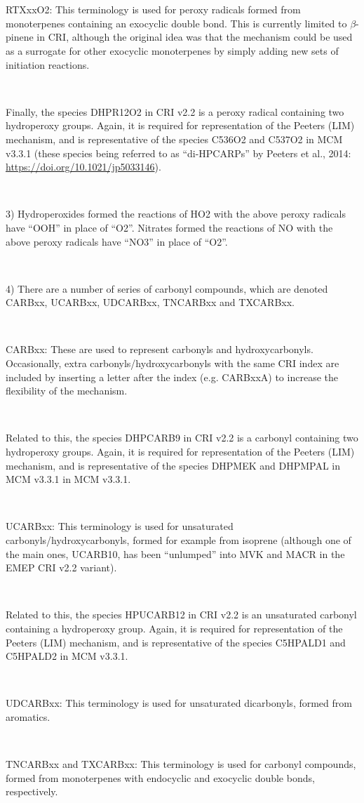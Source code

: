 {{\\}\\ \parbox{\textwidth}{
RTXxxO2: This terminology is used for peroxy radicals formed from monoterpenes containing an exocyclic double bond. This is currently limited to $\beta$-pinene in CRI, although the original idea was that the mechanism could be used as a surrogate for other exocyclic monoterpenes by simply adding new sets of initiation reactions.
\\}\\ \parbox{\textwidth}{
Finally, the species DHPR12O2 in CRI v2.2 is a peroxy radical containing two hydroperoxy groups. Again, it is required for representation of the Peeters (LIM) mechanism, and is representative of the species C536O2 and C537O2 in MCM v3.3.1 (these species being referred to as “di-HPCARPs” by Peeters et al., 2014: \url{https://doi.org/10.1021/jp5033146}).
\\}\\ \parbox{\textwidth}{
3) Hydroperoxides formed the reactions of HO2 with the above peroxy radicals have “OOH” in place of “O2”. Nitrates formed the reactions of NO with the above peroxy radicals have “NO3” in place of “O2”.
\\}\\ \parbox{\textwidth}{
4) There are a number of series of carbonyl compounds, which are denoted CARBxx, UCARBxx, UDCARBxx, TNCARBxx and TXCARBxx.
\\}\\ \parbox{\textwidth}{
CARBxx: These are used to represent carbonyls and hydroxycarbonyls. Occasionally, extra carbonyls/hydroxycarbonyls with the same CRI index are included by inserting a letter after the index (e.g. CARBxxA) to increase the flexibility of the mechanism.
\\}\\ \parbox{\textwidth}{
Related to this, the species DHPCARB9 in CRI v2.2 is a carbonyl containing two hydroperoxy groups. Again, it is required for representation of the Peeters (LIM) mechanism, and is representative of the species DHPMEK and DHPMPAL in MCM v3.3.1  in MCM v3.3.1.
\\}\\ \parbox{\textwidth}{
UCARBxx: This terminology is used for unsaturated carbonyls/hydroxycarbonyls, formed for example from isoprene (although one of the main ones, UCARB10, has been “unlumped” into MVK and MACR in the EMEP CRI v2.2 variant).
\\}\\ \parbox{\textwidth}{
Related to this, the species HPUCARB12 in CRI v2.2 is an unsaturated carbonyl containing a hydroperoxy group. Again, it is required for representation of the Peeters (LIM) mechanism, and is representative of the species C5HPALD1 and C5HPALD2 in MCM v3.3.1.
\\}\\ \parbox{\textwidth}{
UDCARBxx: This terminology is used for unsaturated dicarbonyls, formed from aromatics.
\\}\\ \parbox{\textwidth}{
TNCARBxx and TXCARBxx: This terminology is used for carbonyl compounds, formed from monoterpenes with endocyclic and exocyclic double bonds, respectively.

}}
